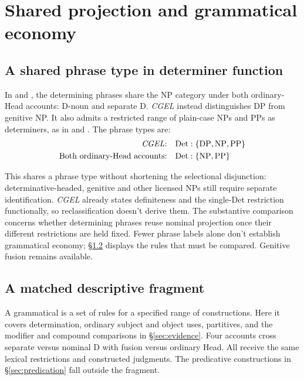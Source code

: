 \documentclass[12pt]{article}
\begin{document}
\section{Shared projection and grammatical economy}\label{sec:economy}

\subsection{A shared phrase type in determiner function}\label{sec:det-uniform}

In  and , the determining phrases share the NP category under both ordinary-Head accounts: D-noun and separate D. \textit{CGEL} instead distinguishes DP from genitive NP. It also admits a restricted range of plain-case NPs and PPs as determiners, as in  and  \citep[Ch.~5, §4]{huddleston2002}. The phrase types are:
\[
\begin{aligned}
\text{\textit{CGEL}:} &\quad \mathrm{Det}:\{\mathrm{DP},\mathrm{NP},\mathrm{PP}\} \\
\text{Both ordinary-Head accounts:} &\quad \mathrm{Det}:\{\mathrm{NP},\mathrm{PP}\}
\end{aligned}
\]

This shares a phrase type without shortening the selectional disjunction: determinative-headed, genitive and other licensed NPs still require separate identification. \textit{CGEL} already states definiteness and the single-Det restriction functionally, so reclassification doesn't derive them. The substantive comparison concerns whether determining phrases reuse nominal projection once their different restrictions are held fixed. Fewer phrase labels alone don't establish grammatical economy; §\ref{sec:fragment} displays the rules that must be compared. Genitive fusion remains available.

\subsection{A matched descriptive fragment}\label{sec:fragment}

A grammatical  is a set of rules for a specified range of constructions. Here it covers determination, ordinary subject and object uses, partitives, and the modifier and compound comparisons in §\ref{sec:evidence}. Four accounts cross separate versus nominal D with fusion versus ordinary Head. All receive the same lexical restrictions and constructed judgments. The predicative constructions in §\ref{sec:predication} fall outside the fragment.
\end{document}

